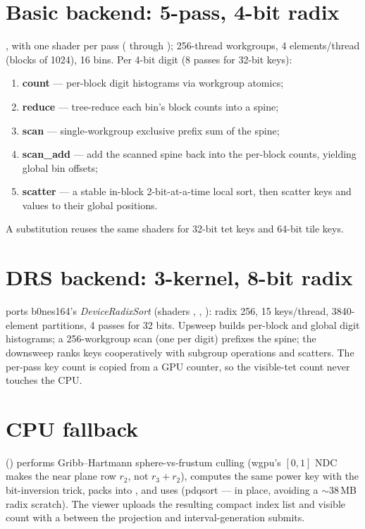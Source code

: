 \section{Basic backend: 5-pass, 4-bit radix}

, with one shader per pass
( through );
256-thread workgroups, 4 elements/thread (blocks of 1024), 16 bins. Per 4-bit digit
(8 passes for 32-bit keys):
\begin{enumerate}
\item \textbf{count} --- per-block digit histograms via workgroup atomics;
\item \textbf{reduce} --- tree-reduce each bin's block counts into a spine;
\item \textbf{scan} --- single-workgroup exclusive prefix sum of the spine;
\item \textbf{scan\_add} --- add the scanned spine back into the per-block
  counts, yielding global bin offsets;
\item \textbf{scatter} --- a stable in-block 2-bit-at-a-time local sort,
  then scatter keys and values to their global positions.
\end{enumerate}
A  substitution reuses the same shaders for 32-bit tet keys
and 64-bit tile keys.

\section{DRS backend: 3-kernel, 8-bit radix}

 ports b0nes164's
\emph{DeviceRadixSort} (shaders ,
, ): radix 256, 15
keys/thread, 3840-element partitions, 4 passes for 32 bits.
Upsweep builds per-block and global digit histograms; a 256-workgroup scan
(one per digit) prefixes the spine; the downsweep ranks keys cooperatively
with subgroup operations and scatters. The per-pass key count is copied from
a GPU counter, so the visible-tet count never touches the CPU.

\section{CPU fallback}

 () performs
Gribb--Hartmann sphere-vs-frustum culling (wgpu's $[0,1]$ NDC makes the near
plane row $r_2$, not $r_3 + r_2$), computes the same power key with the
bit-inversion trick, packs  into , and
uses  (pdqsort --- in place, avoiding a
$\sim$38\,MB radix scratch). The viewer uploads the resulting compact index
list and visible count with a  between the projection and
interval-generation submits.

